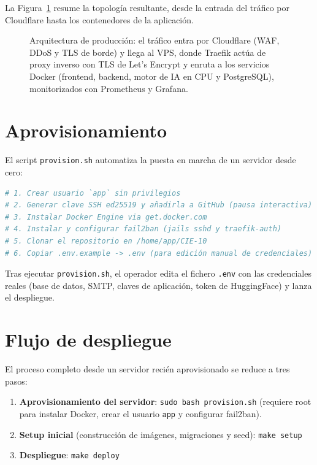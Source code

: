 La Figura~\ref{fig:infra-prod} resume la topología resultante, desde la entrada del tráfico por Cloudflare hasta los contenedores de la aplicación.

\begin{figure}[ht]
\centering
\resizebox{0.85\textwidth}{!}{}
\caption{Arquitectura de producción: el tráfico entra por Cloudflare (WAF, DDoS y TLS de borde) y llega al VPS, donde Traefik actúa de proxy inverso con TLS de Let's Encrypt y enruta a los servicios Docker (frontend, backend, motor de IA en CPU y PostgreSQL), monitorizados con Prometheus y Grafana.}
\label{fig:infra-prod}
\end{figure}

\section{Aprovisionamiento}

El script \texttt{provision.sh} automatiza la puesta en marcha de un servidor desde cero:

\begin{lstlisting}[language=bash, caption={Pasos del script de aprovisionamiento.}, label=lst:provision-sh]
# 1. Crear usuario `app` sin privilegios
# 2. Generar clave SSH ed25519 y añadirla a GitHub (pausa interactiva)
# 3. Instalar Docker Engine via get.docker.com
# 4. Instalar y configurar fail2ban (jails sshd y traefik-auth)
# 5. Clonar el repositorio en /home/app/CIE-10
# 6. Copiar .env.example -> .env (para edición manual de credenciales)
\end{lstlisting}

Tras ejecutar \texttt{provision.sh}, el operador edita el fichero \texttt{.env} con las credenciales reales (base de datos, SMTP, claves de aplicación, token de HuggingFace) y lanza el despliegue.

\section{Flujo de despliegue}

El proceso completo desde un servidor recién aprovisionado se reduce a tres pasos:

\begin{enumerate}
    \item \textbf{Aprovisionamiento del servidor}: \texttt{sudo bash provision.sh} (requiere root para instalar Docker, crear el usuario \texttt{app} y configurar fail2ban).
    \item \textbf{Setup inicial} (construcción de imágenes, migraciones y seed): \texttt{make setup}
    \item \textbf{Despliegue}: \texttt{make deploy}
\end{enumerate}

